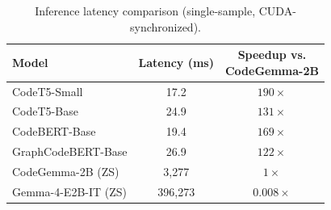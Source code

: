 \documentclass[conference]{IEEEtran}
\begin{document}
\begin{table}[!t]
\centering
\caption{Inference latency comparison (single-sample, CUDA-synchronized).}
\label{tab:latency}
\scriptsize
\setlength{\tabcolsep}{4pt}
\renewcommand{\arraystretch}{1.08}
\begin{tabular}{>{\RaggedRight\arraybackslash}p{3.0cm} c c}
\toprule
\textbf{Model} & \textbf{Latency (ms)} & \shortstack{\textbf{Speedup vs.}\\\textbf{CodeGemma-2B}} \\
\midrule
CodeT5-Small        & 17.2    & $190\times$ \\
CodeT5-Base         & 24.9    & $131\times$ \\
CodeBERT-Base       & 19.4    & $169\times$ \\
GraphCodeBERT-Base  & 26.9    & $122\times$ \\
\midrule
CodeGemma-2B (ZS)   & 3,277   & $1\times$ \\
Gemma-4-E2B-IT (ZS) & 396,273 & $0.008\times$ \\
\bottomrule
\end{tabular}
\end{table}
\end{document}
